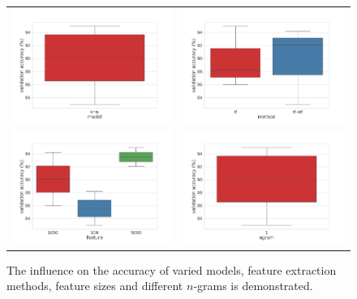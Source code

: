 \documentclass[a4paper,12pt,nottoc]{article}
\begin{document}
\begin{figure}[h]
\begin{center}
\begin{tabular}{c c}
\includegraphics[width=8cm]{output/model_performance.png} & \includegraphics[width=8cm]{output/method_performance.png} \\
\includegraphics[width=8cm]{output/feature_performance.png} & \includegraphics[width=8cm]{output/ngram_performance.png} \\
\end{tabular}
\end{center}
\caption{The influence on the accuracy of varied models, feature extraction methods, feature sizes and different $n$-grams is demonstrated.}\label{fig:influenceparams}
\end{figure}
\end{document}
